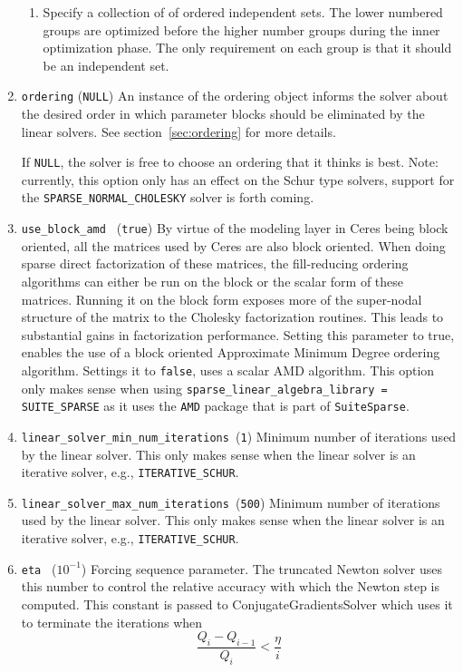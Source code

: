 \begin{enumerate}
\begin{enumerate}
\item Specify a collection of of ordered independent sets. The lower
  numbered groups are optimized before the higher number groups during
  the inner optimization phase. The only requirement on each group is
  that it should be an independent set.
\end{enumerate}

\item{\texttt{ordering} (\texttt{NULL})} An instance of the ordering
  object informs the solver about the desired order in which parameter
  blocks should be eliminated by the linear solvers. See
  section~\ref{sec:ordering} for more details.

  If \texttt{NULL}, the solver is free to choose an ordering that it
  thinks is best. Note: currently, this option only has an effect on
  the Schur type solvers, support for the
  \texttt{SPARSE\_NORMAL\_CHOLESKY} solver is forth coming.

\item{\texttt{use\_block\_amd } (\texttt{true})} By virtue of the
  modeling layer in Ceres being block oriented, all the matrices used
  by Ceres are also block oriented.  When doing sparse direct
  factorization of these matrices, the fill-reducing ordering
  algorithms can either be run on the block or the scalar form of
  these matrices. Running it on the block form exposes more of the
  super-nodal structure of the matrix to the Cholesky factorization
  routines. This leads to substantial gains in factorization
  performance. Setting this parameter to true, enables the use of a
  block oriented Approximate Minimum Degree ordering
  algorithm. Settings it to \texttt{false}, uses a scalar AMD
  algorithm. This option only makes sense when using
  \texttt{sparse\_linear\_algebra\_library = SUITE\_SPARSE} as it uses
  the \texttt{AMD} package that is part of \texttt{SuiteSparse}.

\item{\texttt{linear\_solver\_min\_num\_iterations }}(\texttt{1})
  Minimum number of iterations used by the linear solver. This only
  makes sense when the linear solver is an iterative solver, e.g.,
  \texttt{ITERATIVE\_SCHUR}.

\item{\texttt{linear\_solver\_max\_num\_iterations }}(\texttt{500})
  Minimum number of iterations used by the linear solver. This only
  makes sense when the linear solver is an iterative solver, e.g.,
  \texttt{ITERATIVE\_SCHUR}.

\item{\texttt{eta }} ($10^{-1}$)
 Forcing sequence parameter. The truncated Newton solver uses this
 number to control the relative accuracy with which the Newton step is
 computed. This constant is passed to ConjugateGradientsSolver which
 uses it to terminate the iterations when
\begin{equation}
\frac{Q_i - Q_{i-1}}{Q_i} < \frac{\eta}{i}
\end{equation}


\end{enumerate}
